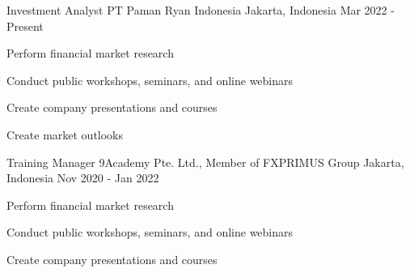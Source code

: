 

\begin{cventries}

  \cventry
    {Investment Analyst} %
    {PT Paman Ryan Indonesia} %
    {Jakarta, Indonesia} %
    {Mar 2022 - Present} %
    {
      \begin{cvitems} %
        \item {Perform financial market research}
        \item {Conduct public workshops, seminars, and online webinars}
        \item {Create company presentations and courses}
        \item {Create market outlooks}
      \end{cvitems}
    }

  \cventry
    {Training Manager} %
    {9Academy Pte. Ltd., Member of FXPRIMUS Group } %
    {Jakarta, Indonesia} %
    {Nov 2020 - Jan 2022} %
    {
      \begin{cvitems} %
        \item {Perform financial market research}
        \item {Conduct public workshops, seminars, and online webinars}
        \item {Create company presentations and courses}
      \end{cvitems}
    }


\end{cventries}
